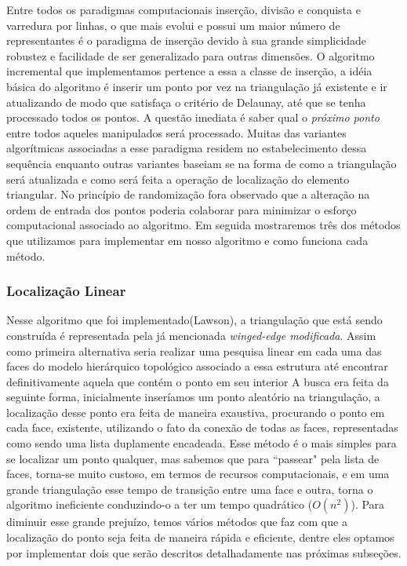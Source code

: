 \documentclass[12pt,a4paper]{book}
\begin{document}
Entre todos os paradigmas computacionais inser\c{c}\~ao, divis\~ao e conquista e varredura por linhas, o que mais evolui e possui um maior n\'umero de representantes \'e o paradigma de inser\c{c}\~ao devido \`a sua grande simplicidade robustez e facilidade de ser generalizado para outras dimens\~oes. O algoritmo incremental que implementamos pertence a essa a classe de inser\c{c}\~ao, a id\'eia b\'asica do algoritmo \'e inserir um ponto por vez na triangula\c{c}\~ao j\'a existente e ir atualizando de modo que satisfa\c{c}a 
o crit\'erio de Delaunay, at\'e que se tenha processado todos os pontos. A quest\~ao imediata \'e saber qual o \textit{pr\'oximo ponto} entre todos aqueles manipulados ser\'a processado. Muitas das variantes algor\'itmicas associadas a esse paradigma residem no estabelecimento dessa sequ\^encia enquanto outras variantes baseiam se na forma de como a triangula\c{c}\~ao ser\'a atualizada e como ser\'a feita a opera\c{c}\~ao de localiza\c{c}\~ao do elemento triangular. No princ\'ipio de randomiza\c{c}\~ao fora observado que a altera\c{c}\~ao na ordem de entrada dos pontos poderia colaborar para minimizar o esfor\c{c}o computacional associado ao algoritmo. Em seguida mostraremos tr\^es dos m\'etodos que utilizamos para implementar em nosso algoritmo e como funciona cada m\'etodo.

\subsubsection{Localiza\c{c}\~ao Linear}

Nesse algoritmo que foi implementado(Lawson), a triangula\c{c}\~ao que est\'a sendo constru\'ida \'e representada pela j\'a mencionada \textit{winged-edge modificada}. Assim como primeira alternativa seria realizar uma pesquisa linear em cada uma das faces do modelo hier\'arquico topol\'ogico associado a essa estrutura at\'e encontrar definitivamente aquela que cont\'em o ponto em seu interior
A busca era feita da seguinte forma, inicialmente inser\'iamos um ponto aleat\'orio na triangula\c{c}\~{a}o, a localiza\c{c}\~{a}o desse ponto era feita de maneira exaustiva, procurando o ponto em cada face, existente, utilizando o fato da conex\~{a}o de todas as faces, representadas como sendo uma lista duplamente encadeada. Esse m\'{e}todo \'{e} o mais simples para se localizar um ponto qualquer, mas sabemos que para ``passear" pela lista de faces, torna-se muito custoso, em termos de recursos computacionais, e em uma grande triangula\c{c}\~{a}o esse tempo de transi\c{c}\~{a}o entre uma face e outra, torna o algoritmo ineficiente conduzindo-o a ter um tempo quadr\'atico ($O(n^2)$). Para diminuir esse grande preju\'{i}zo, temos v\'{a}rios m\'{e}todos que faz com que a localiza\c{c}\~{a}o do ponto seja feita de maneira r\'{a}pida e eficiente, dentre eles optamos por implementar dois que ser\~{a}o descritos detalhadamente nas pr\'{o}ximas subse\c{c}\~oes.
\end{document}
